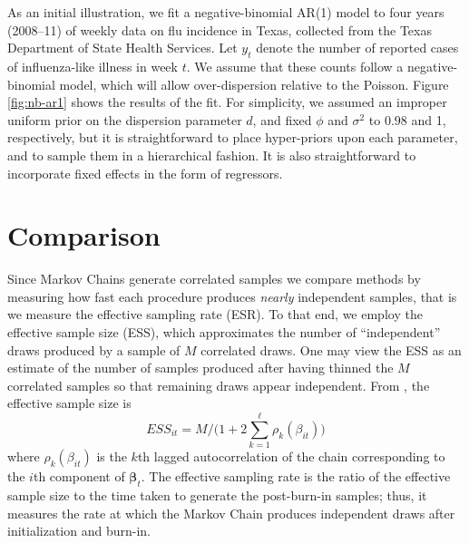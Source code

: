 \documentclass[12pt]{article}
\newcommand{\Polya}{P\'{o}lya}
\newcommand{\bbeta}{\boldsymbol{\beta}}
\begin{document}
As an initial illustration, we fit a negative-binomial AR(1) model to four years
(2008--11) of weekly data on flu incidence in Texas, collected from the Texas
Department of State Health Services.  Let $y_t$ denote the number of reported
cases of influenza-like illness in week $t$.  We assume that these counts follow
a negative-binomial model, which will allow over-dispersion relative to the
Poisson.
Figure \ref{fig:nb-ar1} shows the results of the fit. For simplicity, we assumed
an improper uniform prior on the dispersion parameter $d$, and fixed $\phi$ and
$\sigma^2$ to $0.98$ and 1, respectively, but it is straightforward to place
hyper-priors upon each parameter, and to sample them in a hierarchical fashion.
It is also straightforward to incorporate fixed effects in the form of
regressors.


\section{Comparison}


Since Markov Chains generate correlated samples we compare methods by measuring
how fast each procedure produces \emph{nearly} independent samples, that is we
measure the effective sampling rate (ESR).  To that end, we employ the effective
sample size (ESS), which approximates the number of ``independent'' draws
produced by a sample of $M$ correlated draws.  One may view the ESS as an
estimate of the number of samples produced after having thinned the $M$
correlated samples so that remaining draws appear independent.  From
\cite{holmes-held-2006}, the effective sample size is
\[
ESS_{it} = M / \Big( 1 + 2 \sum_{k=1}^\ell \rho_k(\beta_{it}) \Big)
\]
where $\rho_k(\beta_{it})$ is the $k$th lagged autocorrelation of the chain
corresponding to the $i$th component of $\bbeta_t$.  The effective
sampling rate is the ratio of the effective sample size to the time taken to
generate the post-burn-in samples; thus, it measures the rate at which the
Markov Chain produces independent draws after initialization and burn-in.
\end{document}

